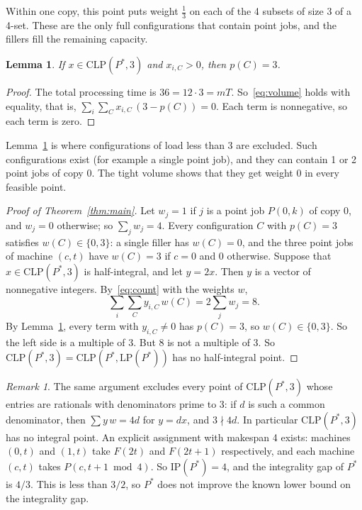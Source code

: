 \documentclass[11pt]{article}
\newtheorem{lemma}[theorem]{Lemma}
\theoremstyle{remark}
\newtheorem{remark}[theorem]{Remark}
\newcommand{\CLP}{\mathrm{CLP}}
\newcommand{\LP}{\mathrm{LP}}
\newcommand{\IP}{\mathrm{IP}}
\begin{document}
Within one copy, this point puts weight $\frac13$ on each of the 4
subsets of size 3 of a 4-set. These are the only full configurations
that contain point jobs, and the fillers fill the remaining capacity.

\begin{lemma}\label{lem:full}
If $x\in\CLP(P^\ast,3)$ and $x_{i,C}>0$, then $p(C)=3$.
\end{lemma}
\begin{proof}
The total processing time is $36=12\cdot 3=mT$. So~\eqref{eq:volume}
holds with equality, that is,
$\sum_i\sum_C x_{i,C}\,(3-p(C))=0$. Each term is nonnegative, so each
term is zero.
\end{proof}

Lemma~\ref{lem:full} is where configurations of load less than 3 are
excluded. Such configurations exist (for example a single point job),
and they can contain 1 or 2 point jobs of copy 0. The tight volume
shows that they get weight 0 in every feasible point.

\begin{proof}[Proof of Theorem~\ref{thm:main}]
Let $w_j=1$ if $j$ is a point job $P(0,k)$ of copy 0, and $w_j=0$
otherwise; so $\sum_j w_j=4$. Every configuration $C$ with $p(C)=3$
satisfies $w(C)\in\{0,3\}$: a single filler has $w(C)=0$, and the
three point jobs of machine $(c,t)$ have $w(C)=3$ if $c=0$ and $0$
otherwise. Suppose that $x\in\CLP(P^\ast,3)$ is half-integral, and let
$y=2x$. Then $y$ is a vector of nonnegative integers. By~\eqref{eq:count}
with the weights $w$,
\[
\sum_i\sum_C y_{i,C}\,w(C)=2\sum_j w_j=8 .
\]
By Lemma~\ref{lem:full}, every term with $y_{i,C}\neq0$ has $p(C)=3$,
so $w(C)\in\{0,3\}$. So the left side is a multiple of 3. But 8 is not
a multiple of 3. So $\CLP(P^\ast,3)=\CLP(P^\ast,\LP(P^\ast))$ has no
half-integral point.
\end{proof}

\begin{remark}
The same argument excludes every point of $\CLP(P^\ast,3)$ whose
entries are rationals with denominators prime to 3: if $d$ is such a
common denominator, then $\sum y\,w=4d$ for $y=dx$, and $3\nmid 4d$.
In particular $\CLP(P^\ast,3)$ has no integral point. An explicit
assignment with makespan 4 exists: machines $(0,t)$ and $(1,t)$ take
$F(2t)$ and $F(2t+1)$ respectively, and each machine $(c,t)$ takes
$P(c,t+1\bmod 4)$. So $\IP(P^\ast)=4$, and the integrality gap of
$P^\ast$ is $4/3$. This is less than $3/2$, so $P^\ast$ does not
improve the known lower bound on the integrality gap.
\end{remark}
\end{document}

